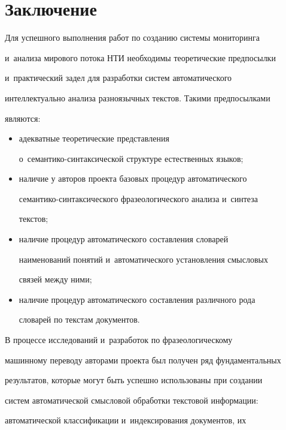 \section{Заключение}


      


     Для успешного выполнения работ по созданию системы мониторинга 


и~анализа мирового потока НТИ необходимы теоретические предпосылки 


и~практический задел для разработки систем автоматического 


интеллектуально анализа разноязычных текстов. Такими предпосылками 


являются: 


     \begin{itemize}


\item адекватные теоретические представления 


о~семантико-синтаксической структуре естественных языков;


\item наличие у авторов проекта базовых процедур автоматического 


се\-ман\-ти\-ко-син\-так\-си\-че\-ско\-го фразеологического анализа и~синтеза 


текстов;


\item наличие процедур автоматического составления словарей 


наименований понятий и~автоматического установления смысловых 


связей между ними; 


\item наличие процедур автоматического составления различного рода 


словарей по текстам документов.


\end{itemize}





     В процессе исследований и~разработок по фразеологическому 


машинному переводу авторами проекта был получен ряд фундаментальных 


результатов, которые могут быть успешно использованы при создании 


систем автоматической смысловой обработки текстовой информации: 


автоматической классификации и~индексирования документов, их 


